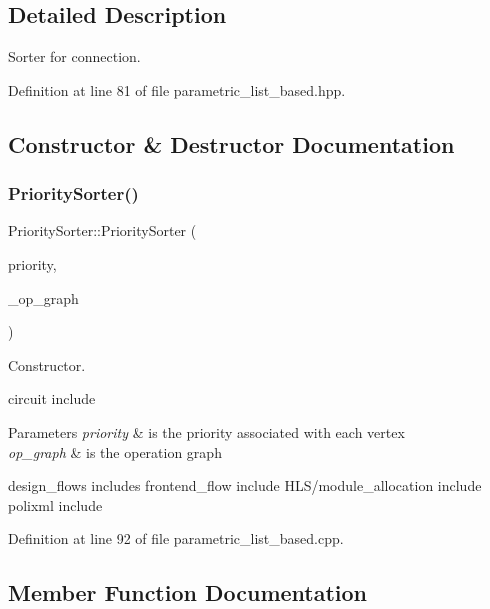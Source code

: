 \subsection{Detailed Description}
Sorter for connection. 

Definition at line 81 of file parametric\+\_\+list\+\_\+based.\+hpp.



\subsection{Constructor \& Destructor Documentation}
\mbox{\label{structPrioritySorter_ae8a474996b713df838539521af5a097f}} 
\subsubsection{\texorpdfstring{Priority\+Sorter()}{PrioritySorter()}}
{\footnotesize\ttfamily Priority\+Sorter\+::\+Priority\+Sorter (\begin{DoxyParamCaption}\item[{const \hyperlink{structrefcount}{refcount}$<$ \hyperlink{structpriority__data}{priority\+\_\+data}$<$ int $>$$>$}]{priority,  }\item[{const \hyperlink{op__graph_8hpp_a9a0b240622c47584bee6951a6f5de746}{Op\+Graph\+Const\+Ref}}]{\+\_\+op\+\_\+graph }\end{DoxyParamCaption})}



Constructor. 

circuit include


\begin{DoxyParams}{Parameters}
{\em priority} & is the priority associated with each vertex \\
\hline
{\em op\+\_\+graph} & is the operation graph\\
\hline
\end{DoxyParams}
design\+\_\+flows includes frontend\+\_\+flow include H\+L\+S/module\+\_\+allocation include polixml include 

Definition at line 92 of file parametric\+\_\+list\+\_\+based.\+cpp.



\subsection{Member Function Documentation}
\mbox{\label{structPrioritySorter_ad91c06049bceb95e02312fb3ad37f7db}} 

